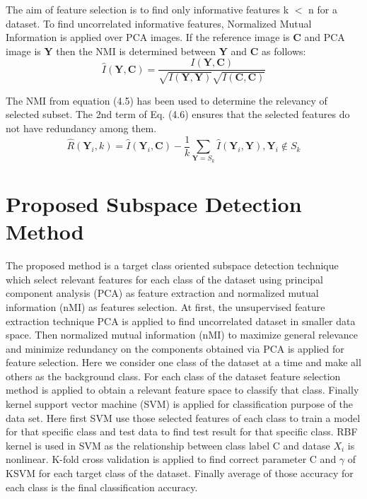 \documentclass[document.tex]{subfiles}
\begin{document}
\noindent The aim of feature selection is to find only informative features
k $<$ n for a dataset. To find uncorrelated informative features, Normalized
Mutual Information is applied over PCA images. If the reference image is \textbf{C} and PCA image is \textbf{Y} then the NMI is determined between \textbf{Y} and \textbf{C} as follows:
\begin{equation}
\hat{I}(\textbf{Y},\textbf{C}) = \dfrac{I(\textbf{Y}, \textbf{C})}{\sqrt{I(\textbf{Y},\textbf{Y})}\sqrt{I( \textbf{C}, \textbf{C})}}
\end{equation}

\noindent The NMI from equation (4.5) has been used to determine the relevancy of selected subset. The 2nd term of Eq. (4.6) ensures that the selected features do not have redundancy among them. 
\begin{equation}
\hat{R}(\textbf{Y}_i,k) = \hat{I}(\textbf{Y}_i,\textbf{C}) - \dfrac{1}{k} \sum_{\textbf{Y} = S_k} \hat{I}(\textbf{Y}_i,\textbf{Y}),  \textbf{Y}_i\notin S_k
\end{equation}

\section{Proposed Subspace Detection Method}
\noindent The proposed method is a target class oriented subspace detection technique which select relevant features for each class of the dataset using principal component analysis (PCA) as feature extraction\cite{7} and normalized mutual information (nMI) as features selection\cite{9}. At first, the unsupervised feature extraction technique PCA is applied to find uncorrelated dataset in smaller data space. Then normalized mutual information (nMI)  to maximize general relevance and minimize redundancy on the components obtained via PCA is applied for feature selection\cite{21}. Here we consider one class of the dataset at a time and make all others as the background class. For each class of the dataset feature selection method is applied to obtain a relevant feature space to classify that class. Finally kernel support vector machine (SVM) is applied for classification purpose of the data set\cite{11}. Here first SVM use those selected features of each class to train a model for that specific class and test data to find test result for that specific class. RBF kernel\cite{22} is used in SVM as the relationship between class label C and datase $X_i$ is nonlinear. K-fold cross validation is applied to find correct parameter C and $\gamma$ of KSVM for each target class of the dataset. Finally average of those accuracy for each class is the final classification accuracy.
\end{document}
